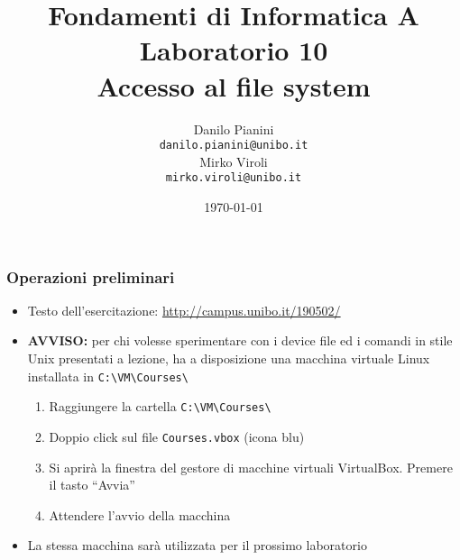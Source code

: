 \documentclass{beamer}
\begin{document}
\title[Lab1 - FV]{Fondamenti di Informatica A \\ Laboratorio 10 \\ Accesso al file system}
\author[Danilo Pianini]{Danilo Pianini\\\texttt{danilo.pianini@unibo.it} \\ \vspace{3pt} Mirko Viroli\\\texttt{mirko.viroli@unibo.it} }
\date[\today]{\today}

\frame{\titlepage} 

\newcommand{\vmfolder}{\texttt{C:\textbackslash{}VM\textbackslash{}Courses\textbackslash{}}}

\begin{frame}[fragile]
\frametitle{Operazioni preliminari}
\begin{itemize}
 \item Testo dell'esercitazione: \url{http://campus.unibo.it/190502/}
 \item \textbf{AVVISO:} per chi volesse sperimentare con i device file ed i comandi in stile Unix presentati a lezione, ha a disposizione una macchina virtuale Linux installata in \vmfolder{}
 \begin{enumerate}
  \item Raggiungere la cartella \vmfolder{}
  \item Doppio click sul file \texttt{Courses.vbox} (icona blu)
  \item Si aprirà la finestra del gestore di macchine virtuali VirtualBox. Premere il tasto ``Avvia''
  \item Attendere l'avvio della macchina
 \end{enumerate}
 \item La stessa macchina sarà utilizzata per il prossimo laboratorio
\end{itemize}
\end{frame}
\end{document}
